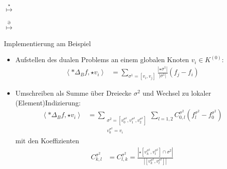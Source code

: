 \documentclass{beamer}
\begin{document}
\begin{frame}
\begin{overprint}
\begin{minipage}{0.4\textwidth}
            \centering 
          \end{minipage}\hfill
          {\Huge\(\overset{\star}{\longmapsto}\)}  \hfill
          \begin{minipage}{0.4\textwidth}
            \centering 
          \end{minipage}
          \begin{minipage}{0.4\textwidth}
            \centering 
          \end{minipage}\hfill
          {\Huge\(\overset{\partial}{\longmapsto}\)}  \hfill
          \begin{minipage}{0.4\textwidth}
            \centering 
          \end{minipage}
    \end{overprint}
  \end{frame}

  \begin{frame}
    \begin{block}{Implementierung am Beispiel}
      \small
      \begin{itemize}
        \item<1-> Aufstellen des dualen Problems an einem globalen Knoten \( v_{i}\in K^{(0)} \):
            \begin{align*}
              \left\langle *\Delta_{B} f , \star v_{i} \right\rangle
                     &= \sum_{\sigma^{1}=\left[ v_{i}, v_{j} \right]} 
                     \frac{\left| \star\sigma^{1} \right|}{\left| \sigma^{1} \right|}
                      \left( f_{j} - f_{i} \right)
            \end{align*}
        \item<2-> Umschreiben als Summe über Dreiecke \( \sigma^{2} \) und Wechsel zu lokaler (Element)Indizierung:
              \begin{align*}
                \left\langle *\Delta_{B} f , \star v_{i} \right\rangle
                               &= \sum_{\substack{\sigma^{2}=\left[ v^{\sigma^{2}}_{0},v^{\sigma^{2}}_{1},v^{\sigma^{2}}_{2} \right]\\
                                               v^{\sigma^{2}}_{0} = v_{i}}}
                  \sum_{l=1,2} C^{\sigma^{2}}_{0,l} 
                          \left( f^{\sigma^{2}}_{l} -  f^{\sigma^{2}}_{0}\right)
              \end{align*}
              mit den Koeffizienten
              \begin{align*}
               C^{\sigma^{2}}_{k,l} &= C^{\sigma^{2}}_{l,k}
                            = \frac{\left| \star \left[ v^{\sigma^{2}}_{k}, v^{\sigma^{2}}_{l} \right] 
                                            \cap \sigma^{2}\right|}
                                   {\left| \left[ v^{\sigma^{2}}_{k}, v^{\sigma^{2}}_{l} \right] \right|}
              \end{align*}
      \end{itemize}
    \end{block}
  \end{frame}
\end{document}
